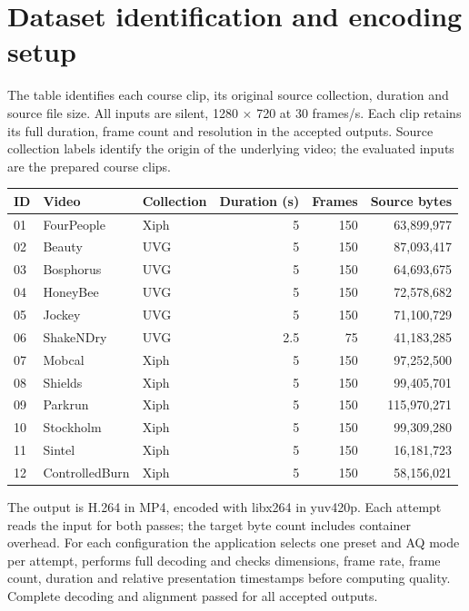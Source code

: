 \documentclass[10pt,a4paper]{article}
\begin{document}
\section{Dataset identification and encoding setup}
The table identifies each course clip, its original source collection, duration and source file size. All inputs are silent, 1280 $\times$ 720 at 30 frames/s. Each clip retains its full duration, frame count and resolution in the accepted outputs. Source collection labels identify the origin of the underlying video; the evaluated inputs are the prepared course clips.
\begin{center}\small\begin{tabular}{lllr r r}\toprule
ID & Video & Collection & Duration (s) & Frames & Source bytes\\\midrule
01 & FourPeople & Xiph & 5 & 150 & 63,899,977 \\
02 & Beauty & UVG & 5 & 150 & 87,093,417 \\
03 & Bosphorus & UVG & 5 & 150 & 64,693,675 \\
04 & HoneyBee & UVG & 5 & 150 & 72,578,682 \\
05 & Jockey & UVG & 5 & 150 & 71,100,729 \\
06 & ShakeNDry & UVG & 2.5 & 75 & 41,183,285 \\
07 & Mobcal & Xiph & 5 & 150 & 97,252,500 \\
08 & Shields & Xiph & 5 & 150 & 99,405,701 \\
09 & Parkrun & Xiph & 5 & 150 & 115,970,271 \\
10 & Stockholm & Xiph & 5 & 150 & 99,309,280 \\
11 & Sintel & Xiph & 5 & 150 & 16,181,723 \\
12 & ControlledBurn & Xiph & 5 & 150 & 58,156,021 \\
\bottomrule\end{tabular}\end{center}
The output is H.264 in MP4, encoded with libx264 in yuv420p. Each attempt reads the input for both passes; the target byte count includes container overhead. For each configuration the application selects one preset and AQ mode per attempt, performs full decoding and checks dimensions, frame rate, frame count, duration and relative presentation timestamps before computing quality. Complete decoding and alignment passed for all accepted outputs.
\end{document}
